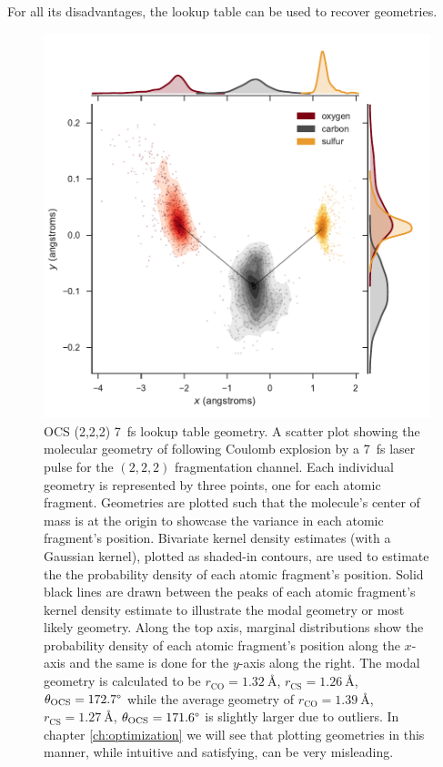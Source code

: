 For all its disadvantages, the lookup table can be used to recover  geometries.

\begin{figure}
  \centering
  \includegraphics[width=\textwidth]{Plots/OCS2227fsLTGeometry}
  \caption[OCS (2,2,2) \SI{7}{\fs} geometry reconstruction by lookup table.]
  {OCS (2,2,2) \SI{7}{\fs} lookup table geometry. A scatter plot showing the molecular geometry of  following Coulomb explosion by a \SI{7}{\fs} laser pulse for the $(2,2,2)$ fragmentation channel. Each individual geometry is represented by three points, one for each atomic fragment. Geometries are plotted such that the molecule's center of mass is at the origin to showcase the variance in each atomic fragment's position. Bivariate kernel density estimates (with a Gaussian kernel), plotted as shaded-in contours, are used to estimate the the probability density of each atomic fragment's position. Solid black lines are drawn between the peaks of each atomic fragment's kernel density estimate to illustrate the modal geometry or most likely geometry. Along the top axis, marginal distributions show the probability density of each  atomic fragment's position along the $x$-axis and the same is done for the $y$-axis along the right. The modal geometry is calculated to be $r_\mathrm{CO} = \SI{1.32}{\angstrom}$, $r_\mathrm{CS} = \SI{1.26}{\angstrom}$, $ \theta_\mathrm{OCS} = 172.7\degree$ while the average geometry of $r_\mathrm{CO} = \SI{1.39}{\angstrom}$, $r_\mathrm{CS} = \SI{1.27}{\angstrom}$, $ \theta_\mathrm{OCS} = 171.6\degree$ is slightly larger due to outliers. In chapter \ref{ch:optimization} we will see that plotting geometries in this manner, while intuitive and satisfying, can be very misleading.}
  \label{fig:OCS2227fsLTGeometry}
\end{figure}

